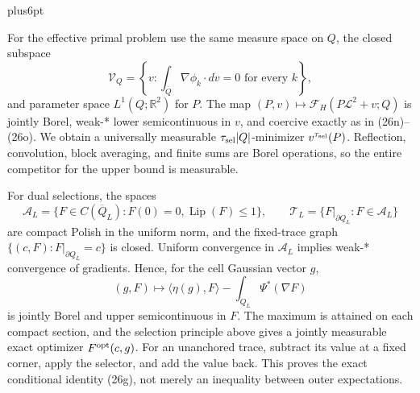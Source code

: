 \documentclass[11pt,reqno]{amsart}
\makeatletter
\theoremstyle{plain}
\theoremstyle{definition}
\theoremstyle{remark}
\renewenvironment{proof}[1][\proofname]{%
  \par
  \pushQED{\qed}%
  \normalfont
  \topsep6pt plus6pt\relax
  \trivlist
  \item[\hskip\labelsep\slshape #1\@addpunct{.}]%
  \ignorespaces
}{%
  \popQED
  \endtrivlist
  \@endpefalse
}
\DeclareRobustCommand{\qed}{%
  \leavevmode\unskip\penalty9999\hbox{}\nobreak
  \ifmmode
    \makebox[0pt][l]{\qquad\hbox{\qedsymbol}}%
  \else
    \qquad\hbox{\qedsymbol}%
  \fi
}
\renewcommand{\qedsymbol}{\rule[.47pt]{4pt}{6pt}}
\numberwithin{equation}{section}
\newcommand{\1}{\mathbf 1}
\makeatother
\begin{document}
\begin{proof}
For the effective primal problem use the same measure space on $Q$,
the closed subspace
\begin{equation*}
\mathscr V_ Q=\left\{v:\int_ {\overline Q}\nabla\phi_ k\cdot dv=0
\text{ for every }k\right\},
\end{equation*}
and parameter space $L^1(Q;\mathbb R^2)$ for $P$.  The map
$(P,v)\mapsto\mathcal F_ H(P\mathcal L^2+v;Q)$ is jointly Borel,
weak-* lower semicontinuous in $v$, and coercive exactly as in
(26n)--(26o).  We obtain a universally measurable
$\tau_{\rm sel}|Q|$-minimizer $v^{\tau_{\rm sel}}(P)$.  Reflection, convolution,
block averaging, and finite sums are Borel operations, so the entire
competitor for the upper bound is measurable.

For dual selections, the spaces
\begin{equation*}
\mathscr A_ L=\{F\in C(\overline Q_ L):F(0)=0,
\operatorname {Lip}(F)\leq1\},
\qquad \mathcal T_ L=\{F|_ {\partial Q_ L}:F\in\mathscr A_ L\}
\end{equation*}
are compact Polish in the uniform norm, and the fixed-trace graph
$\{(c,F):F|_ {\partial Q_ L}=c\}$ is closed.  Uniform convergence in
$\mathscr A_ L$ implies weak-* convergence of gradients.  Hence, for
the cell Gaussian vector $g$,
\begin{equation}
(g,F)\longmapsto\langle\eta(g),F\rangle
-\int_ {Q_ L}\Psi^*(\nabla F)
\tag{26q}
\end{equation}
is jointly Borel and upper semicontinuous in $F$.  The maximum
is attained on each compact section, and the selection principle above
gives a jointly measurable exact optimizer
$F^{\rm opt}(c,g)$.  For an unanchored trace, subtract its value at a
fixed corner, apply the selector, and add the value back.  This proves
the exact conditional identity (26g), not merely an inequality between
outer expectations.


\end{proof}
\end{document}
